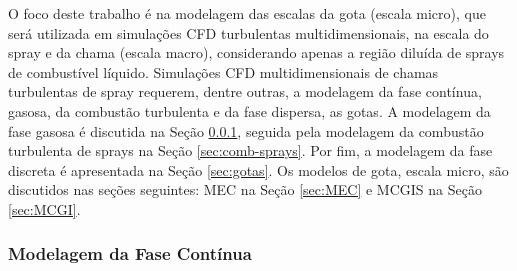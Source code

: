 O foco deste trabalho é na modelagem das escalas da gota (escala micro), que será utilizada em simulações CFD turbulentas multidimensionais, na escala do spray e da chama (escala macro), considerando apenas a região diluída de sprays de combustível líquido.
Simulações CFD multidimensionais de chamas turbulentas de spray requerem, dentre outras, a modelagem da fase contínua, gasosa, da combustão turbulenta e da fase dispersa, as gotas.
A modelagem da fase gasosa é discutida na Seção \ref{sec:gas}, seguida pela modelagem da combustão turbulenta de sprays na Seção \ref{sec:comb-sprays}. 
Por fim, a modelagem da fase discreta é apresentada na Seção \ref{sec:gotas}.
Os modelos de gota, escala micro, são discutidos nas seções seguintes: MEC na Seção	\ref{sec:MEC} e MCGIS na Seção \ref{sec:MCGI}.





\subsubsection{Modelagem da Fase Contínua} \label{sec:gas}



